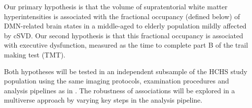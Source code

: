 Our primary hypothesis is that the volume of supratentorial white matter hyperintensities is associated with the fractional occupancy (defined below) of DMN-related brain states in a middle-aged to elderly population mildly affected by cSVD.
Our second hypothesis is that this fractional occupancy is associated with executive dysfunction, measured as the time to complete part B of the trail making test (TMT).

Both hypotheses will be tested in an independent subsample of the HCHS study population using the same imaging protocols, examination procedures and analysis pipelines as in \citep{Schlemm2022-he}.
The robustness of associations will be explored in a multiverse approach by varying key steps in the analysis pipeline.


